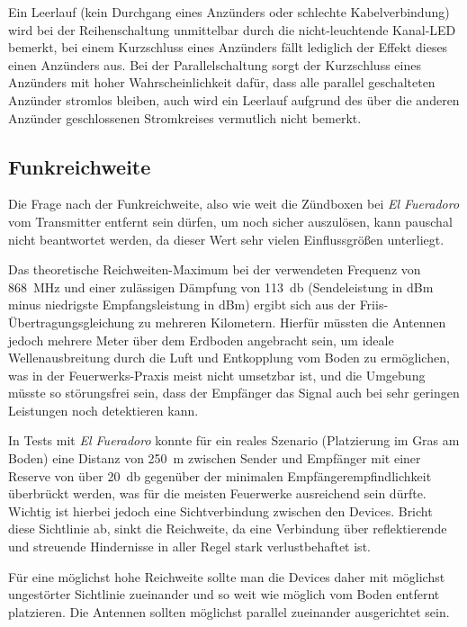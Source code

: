 \documentclass[paper=a4, parskip, numbers=noenddot, toc=listof, headsepline]{scrbook}
\newcommand{\anlage}{\emph{El Fueradoro}}
\begin{document}
				Ein Leerlauf (kein Durchgang eines Anzünders oder schlechte Kabelverbindung) wird bei der Reihenschaltung unmittelbar durch die nicht-leuchtende Kanal-LED bemerkt, bei einem Kurzschluss eines Anzünders fällt lediglich der Effekt dieses einen Anzünders aus. Bei der Parallelschaltung sorgt der Kurzschluss eines Anzünders mit hoher Wahrscheinlichkeit dafür, dass alle parallel geschalteten Anzünder stromlos bleiben, auch wird ein Leerlauf aufgrund des über die anderen Anzünder geschlossenen Stromkreises vermutlich nicht bemerkt.


			\subsection{Funkreichweite}

				Die Frage nach der Funkreichweite, also wie weit die Zündboxen bei {\anlage} vom Transmitter entfernt sein dürfen, um noch sicher auszulösen, kann pauschal nicht beantwortet werden, da dieser Wert sehr vielen Einflussgrößen unterliegt.

				Das theoretische Reichweiten-Maximum bei der verwendeten Frequenz von \SI{868}{\mega\hertz} und einer zulässigen Dämpfung von \SI{113}{\decibel} (Sendeleistung in dBm minus niedrigste Empfangsleistung in dBm) ergibt sich aus der Friis-Übertragungsgleichung zu mehreren Kilometern. Hierfür müssten die Antennen jedoch mehrere Meter über dem Erdboden angebracht sein, um ideale Wellenausbreitung durch die Luft und Entkopplung vom Boden zu ermöglichen, was in der Feuerwerks-Praxis meist nicht umsetzbar ist, und die Umgebung müsste so störungsfrei sein, dass der Empfänger das Signal auch bei sehr geringen Leistungen noch detektieren kann.

				In Tests mit {\anlage} konnte für ein reales Szenario (Platzierung im Gras am Boden) eine Distanz von \SI{250}{\meter} zwischen Sender und Empfänger mit einer Reserve von über \SI{20}{\decibel} gegenüber der minimalen Empfänger\-empfindlichkeit überbrückt werden, was für die meisten Feuerwerke ausreichend sein dürfte. Wichtig ist hierbei jedoch eine Sichtverbindung zwischen den Devices. Bricht diese Sichtlinie ab, sinkt die Reichweite, da eine Verbindung über reflektierende und streuende Hindernisse in aller Regel stark verlustbehaftet ist.

				Für eine möglichst hohe Reichweite sollte man die Devices daher mit möglichst ungestörter Sichtlinie zueinander und so weit wie möglich vom Boden entfernt platzieren. Die Antennen sollten möglichst parallel zueinander ausgerichtet sein.
\end{document}
